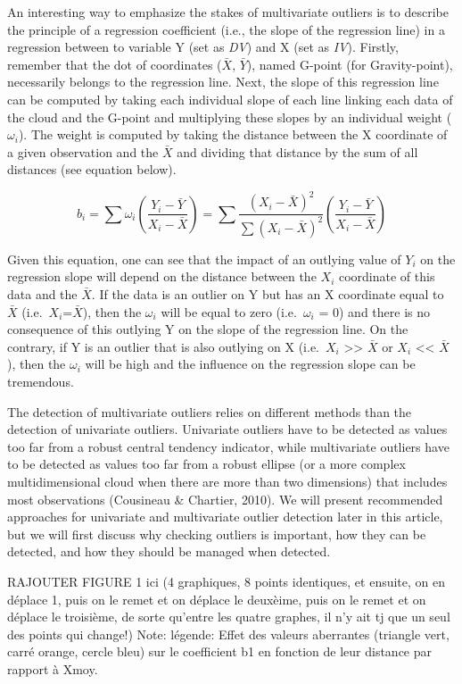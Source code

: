 \documentclass[man,floatsintext]{apa6}
\begin{document}
An interesting way to emphasize the stakes of multivariate outliers is to describe the principle of a regression coefficient (i.e., the slope of the regression line) in a regression between to variable Y (set as \emph{DV}) and X (set as \emph{IV}). Firstly, remember that the dot of coordinates (\(\bar {X}\), \(\bar {Y}\)), named G-point (for Gravity-point), necessarily belongs to the regression line. Next, the slope of this regression line can be computed by taking each individual slope of each line linking each data of the cloud and the G-point and multiplying these slopes by an individual weight (\(\omega_i\)). The weight is computed by taking the distance between the X coordinate of a given observation and the \(\bar{X}\) and dividing that distance by the sum of all distances (see equation below).

\[b_i=\sum\omega_i(\frac{Y_i-\bar{Y}}{ X_i-\bar{X}})= \sum \frac{(X_i-\bar{X})^2}{\sum(X_i-\bar{X})^2} (\frac{Y_i-\bar{Y}}{X_i-\bar{X}})\]

Given this equation, one can see that the impact of an outlying value of \(Y_i\) on the regression slope will depend on the distance between the \(X_i\) coordinate of this data and the \(\bar{X}\). If the data is an outlier on Y but has an X coordinate equal to \(\bar{X}\) (i.e.~\(X_i\)=\(\bar{X}\)), then the \(\omega_i\) will be equal to zero (i.e.~\(\omega_i\) = 0) and there is no consequence of this outlying Y on the slope of the regression line. On the contrary, if Y is an outlier that is also outlying on X (i.e.~\(X_i\) \textgreater{}\textgreater{} \(\bar{X}\) or \(X_i\) \textless{}\textless{} \(\bar{X}\)), then the \(\omega_i\) will be high and the influence on the regression slope can be tremendous.

The detection of multivariate outliers relies on different methods than the detection of univariate outliers. Univariate outliers have to be detected as values too far from a robust central tendency indicator, while multivariate outliers have to be detected as values too far from a robust ellipse (or a more complex multidimensional cloud when there are more than two dimensions) that includes most observations (Cousineau \& Chartier, 2010). We will present recommended approaches for univariate and multivariate outlier detection later in this article, but we will first discuss why checking outliers is important, how they can be detected, and how they should be managed when detected.

RAJOUTER FIGURE 1 ici (4 graphiques, 8 points identiques, et ensuite, on en déplace 1, puis on le remet et on déplace le deuxèime, puis on le remet et on déplace le troisième, de sorte qu'entre les quatre graphes, il n'y ait tj que un seul des points qui change!) Note: légende: Effet des valeurs aberrantes (triangle vert, carré orange, cercle bleu) sur le coefficient b1 en fonction de leur distance par rapport à Xmoy.
\end{document}
